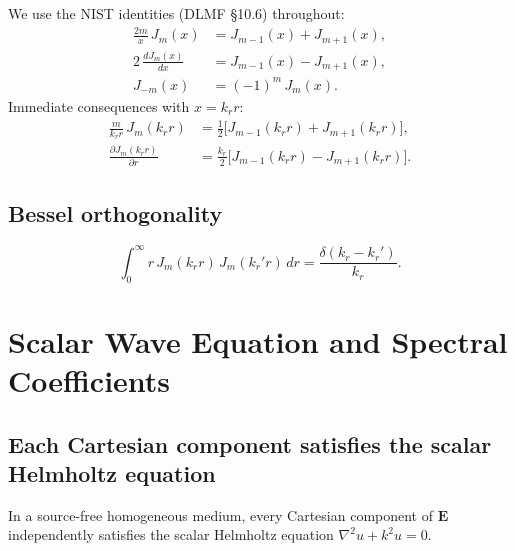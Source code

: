 \documentclass[11pt,a4paper]{article}
\newcommand{\E}{\mathbf{E}}
\begin{document}
We use the NIST identities (DLMF \S10.6) throughout:
\begin{align}
  \frac{2m}{x}\,J_m(x) &= J_{m-1}(x) + J_{m+1}(x), \label{eq:rec1}\\[4pt]
  2\,\frac{dJ_m(x)}{dx} &= J_{m-1}(x) - J_{m+1}(x), \label{eq:rec2}\\[4pt]
  J_{-m}(x) &= (-1)^m\,J_m(x). \label{eq:negm}
\end{align}
Immediate consequences with $x = k_r r$:
\begin{align}
  \frac{m}{k_r r}\,J_m(k_r r) &= \tfrac{1}{2}\bigl[J_{m-1}(k_r r) + J_{m+1}(k_r r)\bigr],
  \label{eq:moverx}\\[4pt]
  \frac{\partial J_m(k_r r)}{\partial r}
  &= \frac{k_r}{2}\bigl[J_{m-1}(k_r r) - J_{m+1}(k_r r)\bigr].
  \label{eq:dJdr}
\end{align}

\subsection{Bessel orthogonality}

\begin{equation}\label{eq:bessel_orth}
  \int_0^\infty r\,J_m(k_r r)\,J_m(k_r' r)\,dr
  = \frac{\delta(k_r - k_r')}{k_r}.
\end{equation}


\section{Scalar Wave Equation and Spectral Coefficients}
\label{sec:scalar_coeffs}

\subsection{Each Cartesian component satisfies the scalar Helmholtz equation}

\begin{tcolorbox}[title=Theorem]
In a source-free homogeneous medium, every Cartesian component of $\E$ independently
satisfies the scalar Helmholtz equation $\nabla^2 u + k^2 u = 0$.
\end{tcolorbox}
\end{document}
